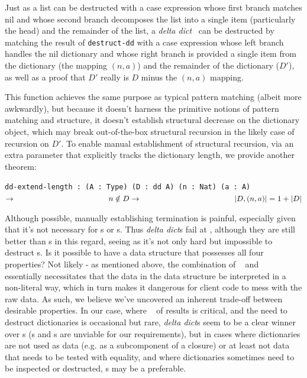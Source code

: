 \documentclass[nonacm]{acmart}
\newcommand{\dd}{\emph{delta dict}}
\theoremstyle{slplain}
\numberwithin{thm}{section}
\begin{document}
Just as a list can be destructed with a case expression whose first branch matches nil and whose second branch
decomposes the list into a single item (particularly the head) and the remainder of the list, a \dd~ can be
destructed by matching the result of \texttt{destruct-dd} with a case expression whose left branch handles the
nil dictionary and whose right branch is provided a single item from the dictionary (the mapping $(n, a)$)
and the remainder of the dictionary ($D'$), as well as a proof that $D'$ really is $D$ minus the $(n, a)$
mapping.

This function achieves the same purpose as typical pattern matching (albeit more awkwardly), but because it
doesn't harness the primitive notions of pattern matching and structure, it doesn't establish structural
decrease on the dictionary object, which may break out-of-the-box structural recursion in the likely case
of recursion on $D'$. To enable manual establishment of structural recursion, via an extra parameter that
explicitly tracks the dictionary length, we provide another theorem:

\texttt{dd-extend-length : (A : Type) (D : dd A) (n : Nat) (a : A) $\rightarrow \\
\phantom{xxxxxxxxxxxxxxxxxxxxx} n \notin D \rightarrow \\
\phantom{xxxxxxxxxxxxxxxxxxxxx} |D, (n, a)| = 1 + |D|$}

Although possible, manually establishing termination is painful, especially given that it's not necessary
for {\SAL}s or {\CAL}s. Thus {\dd}s fail at \EzDstr, although they are still better than {\FPF}s in this
regard, seeing as it's not only hard but impossible to destruct {\FPF}s. Is it possible to have a data
structure that possesses all four properties? Not likely - as mentioned above, the combination of
\SemInj~ and \SemTot~ essentially
necessitates that the data in the data structure be interpreted in a non-literal way, which in turn
makes it dangerous for client code to mess with the raw data. As such, we believe we've uncovered an
inherent trade-off between desirable properties. In our case, where \EqDec~ of results is critical,
and the need to destruct dictionaries is occasional but rare, {\dd}s seem to be a clear winner over
{\CAL}s ({\SAL}s and {\FPF}s are unviable for our requirements), but in cases where dictionaries are
not used as data
(e.g. as a subcomponent of a closure) or at least not data that needs to be tested with equality, and
where dictionaries sometimes need to be inspected or destructed, {\CAL}s may be a preferable.
\end{document}
